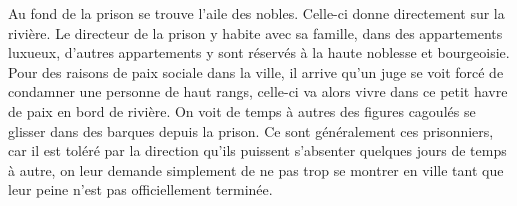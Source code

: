 Au fond de la prison se trouve l'aile des nobles. Celle-ci donne 
directement sur la rivière. Le directeur de la prison y habite avec sa 
famille, dans des appartements luxueux, d'autres appartements y sont 
réservés à la haute noblesse et bourgeoisie. Pour des raisons de paix 
sociale dans la ville, il arrive qu'un juge se voit forcé de condamner une personne
de haut rangs, celle-ci va alors vivre dans ce petit havre de paix en bord
de rivière. On voit 
de temps à autres des figures cagoulés se glisser dans 
des barques depuis la prison. Ce sont généralement ces prisonniers, car il est 
toléré par la direction qu'ils puissent s'absenter quelques jours de temps 
à autre, on leur demande simplement de ne pas trop se montrer en ville 
tant que leur peine n'est pas officiellement terminée.

\begin{figure*}[tb!]
\center
{}
\end{figure*}
